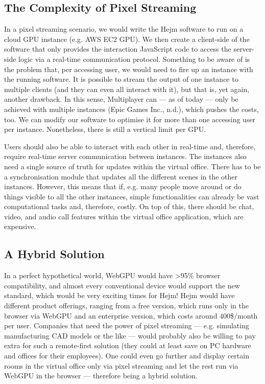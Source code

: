 \documentclass[10pt]{article}
\begin{document}
\begin{sloppypar}
  \subsection{The Complexity of Pixel Streaming}
  \label{subsec:the-complexity-of-pixel-streaming}

  In a pixel streaming scenario, we would write the Hejm software to run on a cloud GPU instance (e.g. AWS EC2 GPU). We then create a client-side of the software that only provides the interaction JavaScript code to access the server-side logic via a real-time communication protocol. Something to be aware of is the problem that, per accessing user, we would need to fire up an instance with the running software. It is possible to stream the output of one instance to multiple clients (and they can even all interact with it), but that is, yet again, another drawback. In this sense, Multiplayer can — as of today — only be achieved with multiple instances (Epic Games Inc., n.d.), which pushes the costs, too. We can modify our software to optimise it for more than one accessing user per instance. Nonetheless, there is still a vertical limit per GPU.

  Users should also be able to interact with each other in real-time and, therefore, require real-time server communication between instances. The instances also need a single source of truth for updates within the virtual office. There has to be a synchronisation module that updates all the different scenes in the other instances. However, this means that if, e.g. many people move around or do things visible to all the other instances, simple functionalities can already be vast computational tasks and, therefore, costly. On top of this, there should be chat, video, and audio call features within the virtual office application, which are expensive.

  \subsection{A Hybrid Solution}
  \label{subsec:a-hybrid-solution}

  In a perfect hypothetical world, WebGPU would have >95\% browser compatibility, and almost every conventional device would support the new standard, which would be very exciting times for Hejm! Hejm would have different product offerings, ranging from a free version, which runs only in the browser via WebGPU and an enterprise version, which costs around 400\$/month per user. Companies that need the power of pixel streaming — e.g. simulating manufacturing CAD models or the like — would probably also be willing to pay extra for such a remote-first solution (they could at least save on PC hardware and offices for their employees). One could even go further and display certain rooms in the virtual office only via pixel streaming and let the rest run via WebGPU in the browser — therefore being a hybrid solution.


\end{sloppypar}
\end{document}
